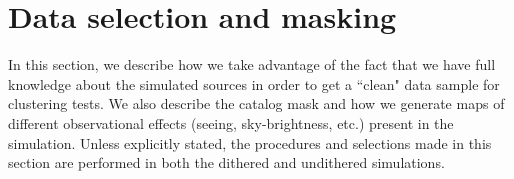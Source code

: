 \documentclass[\docopts]{\docclass}
\begin{document}
%

\section{Data selection and masking}
\label{sec:data_selection}
In this section, we describe how we take advantage of the fact that we have full knowledge about the simulated sources in order to get a ``clean" data sample for clustering tests. We also describe the catalog mask and how we generate maps of different observational effects (seeing, sky-brightness, etc.) present in the simulation. Unless explicitly stated, the procedures and selections made in this section are performed in both the dithered and undithered simulations.
\end{document}
